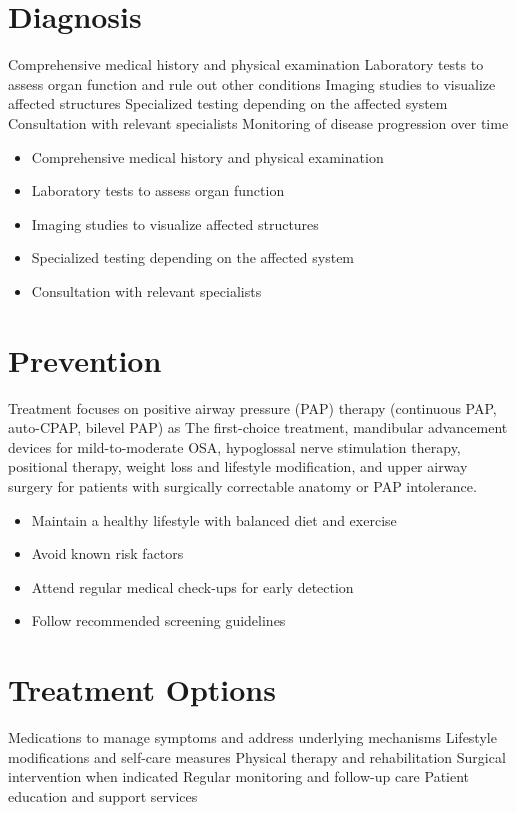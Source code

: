 \section{Diagnosis}
Comprehensive medical history and physical examination Laboratory tests to assess organ function and rule out other conditions Imaging studies to visualize affected structures Specialized testing depending on the affected system Consultation with relevant specialists Monitoring of disease progression over time

\begin{itemize}[noitemsep]
  \item Comprehensive medical history and physical examination
  \item Laboratory tests to assess organ function
  \item Imaging studies to visualize affected structures
  \item Specialized testing depending on the affected system
  \item Consultation with relevant specialists
\end{itemize}
\section{Prevention}
Treatment focuses on positive airway pressure (PAP) therapy (continuous PAP, auto-CPAP, bilevel PAP) as The first-choice treatment, mandibular advancement devices for mild-to-moderate OSA, hypoglossal nerve stimulation therapy, positional therapy, weight loss and lifestyle modification, and upper airway surgery for patients with surgically correctable anatomy or PAP intolerance.

\begin{itemize}[noitemsep]
  \item Maintain a healthy lifestyle with balanced diet and exercise
  \item Avoid known risk factors
  \item Attend regular medical check-ups for early detection
  \item Follow recommended screening guidelines
\end{itemize}
\section{Treatment Options}
Medications to manage symptoms and address underlying mechanisms Lifestyle modifications and self-care measures Physical therapy and rehabilitation Surgical intervention when indicated Regular monitoring and follow-up care Patient education and support services

